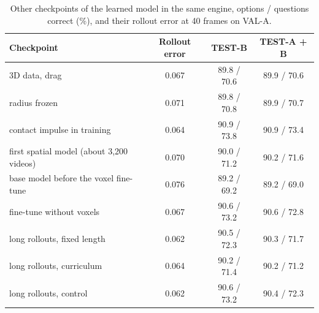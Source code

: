 \documentclass[10pt,onecolumn,letterpaper]{article}
\begin{document}
\begin{table}[h]
\caption{Other checkpoints of the learned model in the same engine, options / questions correct (\%), and their rollout error at 40 frames on VAL-A.}
\label{tab:ckpt}
\centering
\small
\begin{tabular}{@{}lccc@{}}
\toprule
Checkpoint & Rollout error & TEST-B & TEST-A + B \\
\midrule
3D data, drag & 0.067 & 89.8 / 70.6 & 89.9 / 70.6 \\
radius frozen & 0.071 & 89.8 / 70.8 & 89.9 / 70.7 \\
contact impulse in training & 0.064 & 90.9 / 73.8 & 90.9 / 73.4 \\
first spatial model (about 3,200 videos) & 0.070 & 90.0 / 71.2 & 90.2 / 71.6 \\
base model before the voxel fine-tune & 0.076 & 89.2 / 69.2 & 89.2 / 69.0 \\
fine-tune without voxels & 0.067 & 90.6 / 73.2 & 90.6 / 72.8 \\
long rollouts, fixed length & 0.062 & 90.5 / 72.3 & 90.3 / 71.7 \\
long rollouts, curriculum & 0.064 & 90.2 / 71.4 & 90.2 / 71.2 \\
long rollouts, control & 0.062 & 90.6 / 73.2 & 90.4 / 72.3 \\
\bottomrule
\end{tabular}
\end{table}
\end{document}
